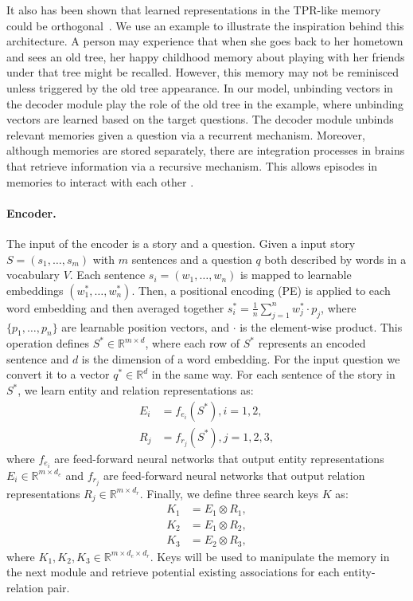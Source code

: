 \documentclass[letterpaper]{article} \usepackage{aaai22}  \usepackage{times}  \usepackage{helvet}  \usepackage{courier}  \usepackage[hyphens]{url}  \usepackage{graphicx} \urlstyle{rm} \def\UrlFont{\rm}  \usepackage{natbib}  \usepackage{caption} \DeclareCaptionStyle{ruled}{labelfont=normalfont,labelsep=colon,strut=off} \frenchspacing  \setlength{\pdfpagewidth}{8.5in}  \setlength{\pdfpageheight}{11in}  \usepackage{algorithm}
\begin{document}
It also has been shown that learned representations in the TPR-like memory could be orthogonal~\cite{schlag2018learning}. We use an example to illustrate the inspiration behind this architecture. A person may experience that when she goes back to her hometown and sees an old tree, her happy childhood memory about playing with her friends under that tree might be recalled. However, this memory may not be reminisced unless triggered by the old tree appearance.
In our model, unbinding vectors in the decoder module play the role of the old tree in the example, where unbinding vectors are learned based on the target questions. 
The decoder module unbinds relevant memories given a question via a recurrent mechanism. 
Moreover, although memories are stored separately, there are integration processes in  brains that retrieve information via a recursive mechanism. This allows episodes in memories to interact with each other 
\cite{kumaran2012generalization, schapiro2017complementary, koster2018big}. 
\paragraph{Encoder.}
The input of the encoder is a story and a question.
Given a input story $S=(s_1, \dots, s_m)$ with $m$ sentences and a question $q$ both described by words in a vocabulary $V$. Each sentence $s_i=(w_1, \dots, w_n)$ is mapped to learnable embeddings $(w^*_1, \dots, w^*_n)$. 
Then, a positional encoding (PE) is applied to each word embedding and then averaged together
$s^*_i=\frac{1}{n}\sum_{j=1}^{n} w^*_j \cdot p_j$, where $\{p_1,\dots,p_n\}$ are learnable position vectors, and $\cdot$ is the element-wise product. This operation defines $S^* \in \mathbb{R}^{m \times d}$, where each row of $S^*$ represents an encoded sentence and $d$ is the dimension of a word embedding. For the input question we convert it to a vector $q^* \in \mathbb{R}^{d}$ in the same way. 
For each sentence of the story in $S^*$, we learn entity and relation representations as:
\begin{align}E_i &= f_{e_i}(S^*),i=1,2, \\
    R_j &= f_{r_j}(S^*),j=1,2,3,
\end{align}
where $f_{e_i}$ are feed-forward neural networks that output entity representations $E_i \in \mathbb{R}^{m \times d_e}$ and 
$f_{r_j}$ are feed-forward neural networks that output relation representations $R_j \in \mathbb{R}^{m \times d_r}$. Finally, we define three search keys $K$ as:
\begin{align}K_1 &= E_1 \otimes R_1, \\
    K_2 &= E_1 \otimes R_2, \\
    K_3 &= E_2 \otimes R_3, 
\end{align}
where $K_1, K_2, K_3 \in \mathbb{R}^{m \times d_e \times d_r}$. Keys will be used to manipulate the memory in the next module and retrieve potential existing associations for each entity-relation pair.
\end{document}
